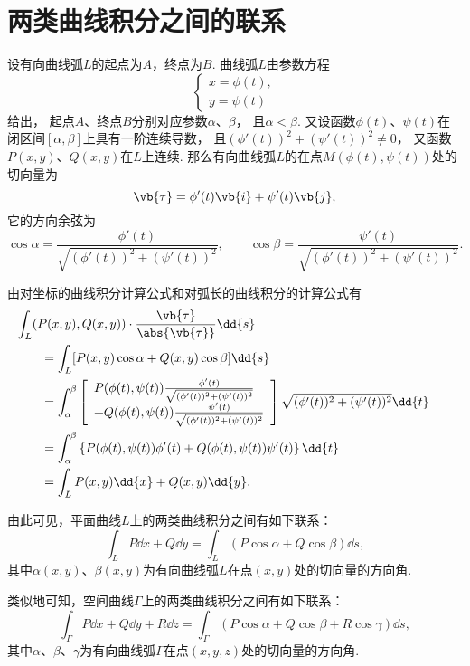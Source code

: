 \section{两类曲线积分之间的联系}
\begingroup
\def\innerProductTau{(\phi'(t))^2+(\psi'(t))^2}%
\def\lenTau{\sqrt{\innerProductTau}}%
\def\fTau#1{\frac{#1}{\lenTau}}%
\def\funcParam{(\phi(t),\psi(t))}%

设有向曲线弧\(L\)的起点为\(A\)，终点为\(B\).
曲线弧\(L\)由参数方程\[
	\begin{cases}
		x = \phi(t), \\
		y = \psi(t)
	\end{cases}
\]给出，
起点\(A\)、终点\(B\)分别对应参数\(\alpha\)、\(\beta\)，
且\(\alpha < \beta\).
又设函数\(\phi(t)\)、\(\psi(t)\)在闭区间\([\alpha,\beta]\)上具有一阶连续导数，
且\(\innerProductTau\neq0\)，
又函数\(P(x,y)\)、\(Q(x,y)\)在\(L\)上连续.
那么有向曲线弧\(L\)的在点\(M(\phi(t),\psi(t))\)处的切向量为\[
	\vb{\tau} = \phi'(t) \vb{i} + \psi'(t) \vb{j},
\]
它的方向余弦为\[
	\cos\alpha
	=\fTau{\phi'(t)},
	\qquad
	\cos\beta
	=\fTau{\psi'(t)}.
\]

由对坐标的曲线积分计算公式和对弧长的曲线积分的计算公式有
\begin{align*}
	&\hspace{-20pt}
	\int_L (P(x,y),Q(x,y))\cdot\frac{\vb{\tau}}{\abs{\vb{\tau}}}\dd{s} \\
	&=\int_L [P(x,y)\cos\alpha+Q(x,y)\cos\beta]\dd{s} \\
	&=\int_\alpha^\beta
		\left[
			\begin{array}{l}
				P\funcParam\fTau{\phi'(t)} \\
				+Q\funcParam\fTau{\psi'(t)}
			\end{array}
		\right]
		\lenTau \dd{t} \\
	&=\int_\alpha^\beta \left\{
			P\funcParam\phi'(t) + Q\funcParam\psi'(t)
		\right\} \dd{t} \\
	&=\int_L{P(x,y)\dd{x}+Q(x,y)\dd{y}}.
\end{align*}
\endgroup

由此可见，平面曲线\(L\)上的两类曲线积分之间有如下联系：
\begin{equation}\label{equation:线积分与面积分.平面曲线上两类曲线积分之间的联系}
	\int_L P\dd{x}+Q\dd{y}
	=\int_L (P\cos\alpha+Q\cos\beta)\dd{s},
\end{equation}
其中\(\alpha(x,y)\)、\(\beta(x,y)\)为有向曲线弧\(L\)在点\((x,y)\)处的切向量的方向角.

类似地可知，空间曲线\(\Gamma\)上的两类曲线积分之间有如下联系：
\begin{equation}\label{equation:线积分与面积分.空间曲线上两类曲线积分之间的联系}
	\int_\Gamma P\dd{x}+Q\dd{y}+R\dd{z}
	=\int_\Gamma (P\cos\alpha+Q\cos\beta+R\cos\gamma)\dd{s},
\end{equation}
其中\(\alpha\)、\(\beta\)、\(\gamma\)为有向曲线弧\(\Gamma\)在点\((x,y,z)\)处的切向量的方向角.


